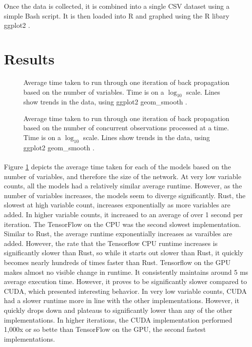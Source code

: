 \documentclass[12pt]{article}
\begin{document}
Once the data is collected, it is combined into a single CSV dataset using a simple Bash script.
It is then loaded into R \cite{lang_r} and graphed using the R libary ggplot2 \cite{lib_ggplot2}.

\section{Results}

\begin{figure}
	\begin{center}
		
	\end{center}
	\caption{Average time taken to run through one iteration of back propagation based on the number of variables. Time is on a $\log_{10}$ scale. Lines show trends in the data, using ggplot2 geom\_smooth \cite{lib_ggplot2}.}
	\label{fig:graph:variables}
\end{figure}

\begin{figure}
	\begin{center}
		
	\end{center}
	\caption{Average time taken to run through one iteration of back propagation based on the number of concurrent observations processed at a time. Time is on a $\log_{10}$ scale. Lines show trends in the data, using ggplot2 geom\_smooth \cite{lib_ggplot2}.}
	\label{fig:graph:observations}
\end{figure}

\paragraph{}
Figure \ref{fig:graph:variables} depicts the average time taken for each of the models based on the number of variables, and therefore the size of the network.
At very low variable counts, all the models had a relatively similar average runtime.
However, as the number of variables increases, the models seem to diverge significantly.
Rust, the slowest at high variable count, increases exponentially as more variables are added.
In higher variable counts, it increased to an average of over 1 second per iteration.
The TensorFlow on the CPU was the second slowest implementation.
Similar to Rust, the average runtime exponentially increases as varaibles are added.
However, the rate that the Tensorflow CPU runtime increases is significantly slower than Rust, so while it starts out slower than Rust, it quickly becomes nearly hundreds of times faster than Rust.
Tensorflow on the GPU makes almost no visible change in runtime.
It consistently maintains around 5 ms average execution time.
However, it proves to be significantly slower compared to CUDA, which presented interesting behavior.
In very low variable counts, CUDA had a slower runtime more in line with the other implementations.
However, it quickly drops down and plateaus to significantly lower than any of the other implementations.
In higher iterations, the CUDA implementation performed 1,000x or so bette than TensorFlow on the GPU, the second fastest implementations.
\end{document}
